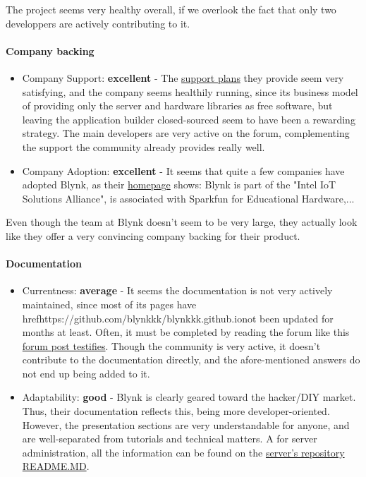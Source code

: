 \documentclass{article}
\begin{document}
The project seems very healthy overall, if we overlook the fact that only two developpers are  actively contributing to it.

\paragraph{Company backing}

\begin{itemize}
\item Company Support: \textbf{excellent} - The \href{http://www.blynk.io/plans/}{support plans} they provide seem very satisfying, and the company seems healthily running, since its business model of providing only the server and hardware libraries as free software, but leaving the application builder closed-sourced seem to have been a rewarding strategy. The main developers are very active on the forum, complementing the support the community already provides really well.
\item Company Adoption: \textbf{excellent} - It seems that quite a few companies have adopted Blynk, as their \href{http://www.blynk.io/#home}{homepage} shows: Blynk is part of the "Intel IoT Solutions Alliance", is associated with Sparkfun for Educational Hardware,...
\end{itemize}

Even though the team at Blynk doesn't seem to be very large, they actually look like they offer a very convincing company backing for their product.

\paragraph{Documentation}

\begin{itemize}
\item Currentness: \textbf{average} - It seems the documentation is not very actively maintained, since most of its pages have \\href{https://github.com/blynkkk/blynkkk.github.io}{not been updated for months} at least. Often, it must be completed by reading the forum like this \href{https://community.blynk.cc/t/solved-issues-installing-and-running-blynk-client-on-rpi/11196/12}{forum post testifies}. Though the community is very active, it doesn't contribute to the documentation directly, and the afore-mentioned answers do not end up being added to it.
\item Adaptability: \textbf{good} - Blynk is clearly geared toward the hacker/DIY market. Thus, their documentation reflects this, being more developer-oriented. However, the presentation sections are very understandable for anyone, and are well-separated from tutorials and technical matters. A for server administration, all the information can be found on the \href{https://github.com/blynkkk/blynk-server#requirements}{server's repository README.MD}.
\end{itemize}
\end{document}
